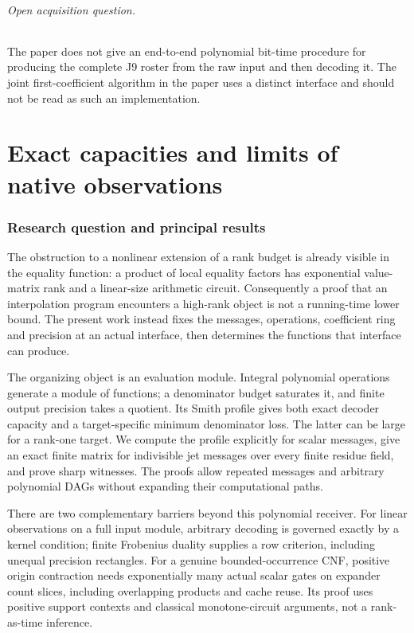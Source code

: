 \documentclass[
  11pt,
]{article}
\begin{document}
\paragraph*{Open acquisition question.}
The paper does not give an end-to-end polynomial bit-time procedure for
producing the complete J9 roster from the raw input and then decoding it.
The joint first-coefficient algorithm in the paper uses a distinct
interface and should not be read as such an implementation.

\tableofcontents
\part{Exact capacities and limits of native observations}
\section{Research question and principal
results}\label{v8-research-question-and-principal-results}

The obstruction to a nonlinear extension of a rank budget is already
visible in the equality function: a product of local equality factors
has exponential value-matrix rank and a linear-size arithmetic circuit.
Consequently a proof that an interpolation program encounters a
high-rank object is not a running-time lower bound. The present work
instead fixes the messages, operations, coefficient ring and precision
at an actual interface, then determines the functions that interface can
produce.

The organizing object is an evaluation module. Integral polynomial
operations generate a module of functions; a denominator budget
saturates it, and finite output precision takes a quotient. Its Smith
profile gives both exact decoder capacity and a target-specific minimum
denominator loss. The latter can be large for a rank-one target. We
compute the profile explicitly for scalar messages, give an exact finite
matrix for indivisible jet messages over every finite residue field, and
prove sharp witnesses. The proofs allow repeated messages and arbitrary
polynomial DAGs without expanding their computational paths.

There are two complementary barriers beyond this polynomial receiver.
For linear observations on a full input module, arbitrary decoding is
governed exactly by a kernel condition; finite Frobenius duality
supplies a row criterion, including unequal precision rectangles. For a
genuine bounded-occurrence CNF, positive origin contraction needs
exponentially many actual scalar gates on expander count slices,
including overlapping products and cache reuse. Its proof uses positive
support contexts and classical monotone-circuit arguments, not a
rank-as-time inference.
\end{document}
